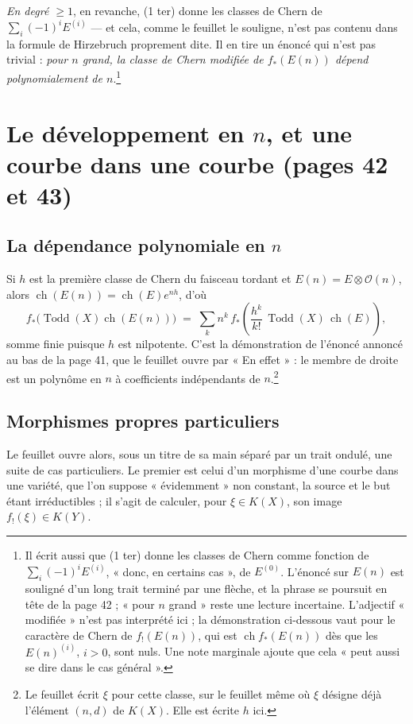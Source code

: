 \documentclass[11pt,a4paper]{article}
\begin{document}
\emph{En degré $\geqslant 1$}, en revanche, (1 ter) donne les classes de Chern
de $\sum_{i}(-1)^{i}E^{(i)}$ --- et cela, comme le feuillet le souligne, n'est
pas contenu dans la formule de Hirzebruch proprement dite. Il en tire un
énoncé qui n'est pas trivial : \emph{pour $n$ grand, la classe de Chern
modifiée de $f_{*}(E(n))$ dépend polynomialement de $n$}.\footnote{Il écrit
aussi que (1 ter) donne les classes de Chern comme fonction de
$\sum_{i}(-1)^{i}E^{(i)}$, « donc, en certains cas », de $E^{(0)}$. L'énoncé
sur $E(n)$ est souligné d'un long trait terminé par une flèche, et la phrase se
poursuit en tête de la page 42 ; « pour $n$ grand » reste une lecture
incertaine. L'adjectif « modifiée » n'est pas interprété ici ; la démonstration
ci-dessous vaut pour le caractère de Chern de $f_{!}(E(n))$, qui est
$\operatorname{ch} f_{*}(E(n))$ dès que les $E(n)^{(i)}$, $i > 0$, sont nuls.
Une note marginale ajoute que cela « peut aussi se dire dans le cas
général ».}

\section*{Le développement en $n$, et une courbe dans une courbe (pages 42 et 43)}

\subsection*{La dépendance polynomiale en $n$}

Si $h$ est la première classe de Chern du faisceau tordant et $E(n) = E \otimes
\mathcal{O}(n)$, alors $\operatorname{ch}(E(n)) = \operatorname{ch}(E)e^{nh}$,
d'où
\[
  f_{*}\bigl(\operatorname{Todd}(X)\operatorname{ch}(E(n))\bigr)
  \;=\; \sum_{k} n^{k}\, f_{*}\!\left(\frac{h^{k}}{k!}\,
  \operatorname{Todd}(X)\,\operatorname{ch}(E)\right),
\]
somme finie puisque $h$ est nilpotente. C'est la démonstration de l'énoncé
annoncé au bas de la page 41, que le feuillet ouvre par « En effet » : le membre de droite est un polynôme en $n$ à
coefficients indépendants de $n$.\footnote{Le feuillet écrit $\xi$ pour cette
classe, sur le feuillet même où $\xi$ désigne déjà l'élément $(n,d)$ de $K(X)$.
Elle est écrite $h$ ici.}

\subsection*{Morphismes propres particuliers}

Le feuillet ouvre alors, sous un titre de sa main séparé par un trait ondulé,
une suite de cas particuliers. Le premier est celui d'un morphisme d'une courbe
dans une variété, que l'on suppose « évidemment » non constant, la source et le
but étant irréductibles ; il s'agit de calculer, pour $\xi \in K(X)$, son image
$f_{!}(\xi) \in K(Y)$.
\end{document}
